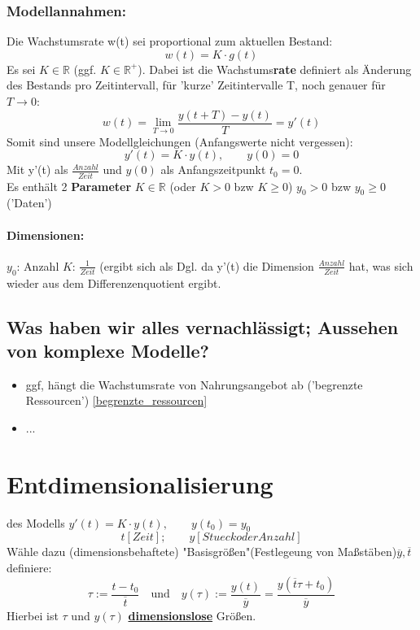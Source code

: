 \documentclass{article}
\numberwithin{equation}{section}
\begin{document}
\subsubsection{Modellannahmen:}
Die Wachstumsrate w(t) sei proportional zum aktuellen Bestand: 
\begin{equation}
w(t)=K\cdot g(t)
\end{equation}
Es sei $K\in\mathbb{R}$ (ggf. $K\in\mathbb{R}^+$).
Dabei ist die Wachstums\textbf{rate} definiert als Änderung des Bestands pro Zeitintervall, für 'kurze' Zeitintervalle T, noch genauer für $T\rightarrow 0$:
\begin{equation}
w(t)=\lim_{T\rightarrow 0} \frac{y(t+T)-y(t)}{T}=y'(t)
\end{equation}
Somit sind unsere Modellgleichungen (Anfangswerte nicht vergessen):
\begin{equation}
\boxed{y'(t)=K\cdot y(t), \qquad y(0)=0}
\end{equation}
Mit y'(t) als $\frac{Anzahl}{Zeit}$ und $y(0)$ als Anfangszeitpunkt $t_0=0$.\\
Es enthält 2 \textbf{Parameter} $K\in \mathbb{R}$ (oder $K>0$ bzw $K\geq 0$) $y_0>0$ bzw $y_0\geq 0$ ('Daten')
\paragraph{Dimensionen:}
$y_0$: Anzahl \qquad
$K$: $\frac{1}{Zeit}$ (ergibt sich als Dgl. da y'(t) die Dimension $\frac{Anzahl}{Zeit}$ hat, was sich wieder aus dem Differenzenquotient ergibt.

\subsection{Was haben wir alles vernachlässigt; Aussehen von komplexe Modelle?}
\begin{itemize}
    \item ggf, hängt die Wachstumsrate von Nahrungsangebot ab ('begrenzte Ressourcen') \ref{begrenzte_ressourcen}
    \item  ...
\end{itemize}

\newpage
\section{Entdimensionalisierung}
des Modells $y'(t)=K\cdot y(t), \qquad y(t_0)=y_0$
\begin{equation}
t [Zeit]; \qquad y [Stueck oder Anzahl]
\end{equation}
Wähle dazu (dimensionsbehaftete) "Basisgrößen"(Festlegeung von Maßstäben)$\overline{y}, \overline{t}$\\
definiere:
\begin{equation}
\tau := \frac{t-t_0}{\overline{t}} \quad\text{und}\quad y(\tau):=\frac{y(t)}{\overline{y}}=\frac{y(\overline{t}\tau + t_0)}{\overline{y}}
\end{equation}
Hierbei ist $\tau$ und $y(\tau)$ \underline{\textbf{dimensionslose}} Größen.
\end{document}
